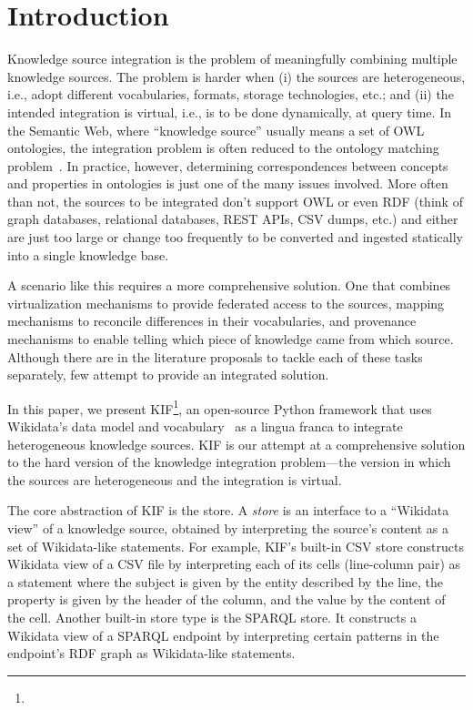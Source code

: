 \section{Introduction}%
\label{sec:introduction}


Knowledge source integration is the problem of meaningfully combining multiple knowledge sources.
The problem is harder when (i) the sources are heterogeneous, i.e., adopt different vocabularies, formats, storage technologies, etc.; and (ii) the intended integration is virtual, i.e., is to be done dynamically, at query time.
In the Semantic Web, where ``knowledge source'' usually means a set of OWL ontologies, the integration problem is often reduced to the ontology matching problem~\cite{Osman-I-2021}.
In practice, however, determining correspondences between concepts and properties in ontologies is just one of the many issues involved.
More often than not, the sources to be integrated don't support OWL or even RDF (think of graph databases, relational databases, REST APIs, CSV dumps, etc.) and either are just too large or change too frequently to be converted and ingested statically into a single knowledge base.


A scenario like this requires a more comprehensive solution.
One that combines virtualization mechanisms to provide federated access to the sources, mapping mechanisms to reconcile differences in their vocabularies, and provenance mechanisms to enable telling which piece of knowledge came from which source.
Although there are in the literature proposals to tackle each of these tasks separately, few attempt to provide an integrated solution.


In this paper, we present KIF\footnote{\KIFURL}, an open-source Python framework that uses Wikidata's data model and vocabulary~\cite{Vrandecic-D-2014} as a lingua franca to integrate heterogeneous knowledge sources.
KIF is our attempt at a comprehensive solution to the hard version of the knowledge integration problem---the version in which the sources are heterogeneous and the integration is virtual.


The core abstraction of KIF is the store.
A \emph{store} is an interface to a ``Wikidata view'' of a knowledge source, obtained by interpreting the source's content as a set of Wikidata-like statements.
For example, KIF's built-in CSV store constructs Wikidata view of a CSV file by interpreting each of its cells (line-column pair) as a statement where the subject is given by the entity described by the line, the property is given by the header of the column, and the value by the content of the cell.
Another built-in store type is the SPARQL store.
It constructs a Wikidata view of a SPARQL endpoint by interpreting certain patterns in the endpoint's RDF graph as Wikidata-like statements.


